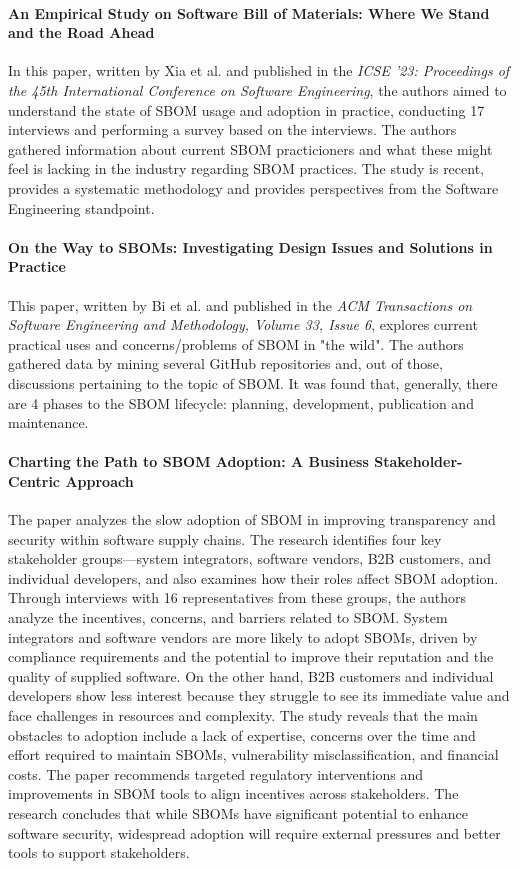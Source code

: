 \paragraph{An Empirical Study on Software Bill of Materials: Where We Stand and the Road Ahead} \cite{article:sbom-study} In this paper, written by Xia et al. and published in the \emph{ICSE '23: Proceedings of the 45th International Conference on Software Engineering}, the authors aimed to understand the state of SBOM usage and adoption in practice, conducting 17 interviews and performing a survey based on the interviews. The authors gathered information about current SBOM practicioners and what these might feel is lacking in the industry regarding SBOM practices. The study is recent, provides a systematic methodology and provides perspectives from the Software Engineering standpoint.

\paragraph{On the Way to SBOMs: Investigating Design Issues and Solutions in Practice} \cite{article:sboms-issues-solutions} This paper, written by Bi et al. and published in the \emph{ACM Transactions on Software Engineering and Methodology, Volume 33, Issue 6}, explores current practical uses and concerns/problems of SBOM in "the wild". The authors gathered data by mining several GitHub repositories and, out of those, discussions pertaining to the topic of SBOM. It was found that, generally, there are 4 phases to the SBOM lifecycle: planning, development, publication and maintenance.

\paragraph{Charting the Path to SBOM Adoption: A Business Stakeholder-Centric Approach} \cite{article:business-sbom} The paper analyzes the slow adoption of SBOM in improving transparency and security within software supply chains. The research identifies four key stakeholder groups—system integrators, software vendors, B2B customers, and individual developers, and also examines how their roles affect SBOM adoption. Through interviews with 16 representatives from these groups, the authors analyze the incentives, concerns, and barriers related to SBOM. System integrators and software vendors are more likely to adopt SBOMs, driven by compliance requirements and the potential to improve their reputation and the quality of supplied software. On the other hand, B2B customers and individual developers show less interest because they struggle to see its immediate value and face challenges in resources and complexity. The study reveals that the main obstacles to adoption include a lack of expertise, concerns over the time and effort required to maintain SBOMs, vulnerability misclassification, and financial costs. The paper recommends targeted regulatory interventions and improvements in SBOM tools to align incentives across stakeholders. The research concludes that while SBOMs have significant potential to enhance software security, widespread adoption will require external pressures and better tools to support stakeholders.

